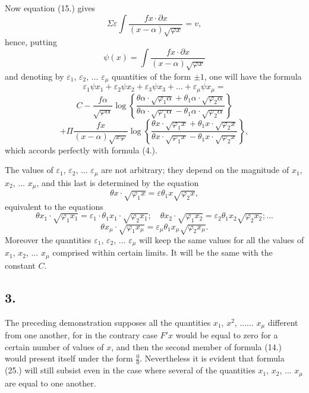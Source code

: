 \documentclass{article}
\begin{document}
Now equation (15.) gives
\[ \Sigma\varepsilon\int \frac{fx \cdot \partial x}{(x-\alpha)\sqrt{\varphi x}} = v, \]
hence, putting
\[ \psi(x) = \int \frac{fx \cdot \partial x}{(x-\alpha)\sqrt{\varphi x}} \tag{24} \]
and denoting by $\varepsilon_1$, $\varepsilon_2$, $\ldots$ $\varepsilon_\mu$ quantities of the form $\pm 1$, one will have the formula
\[ \varepsilon_1\psi x_1 + \varepsilon_2\psi x_2 + \varepsilon_3\psi x_3 + \ldots + \varepsilon_\mu\psi x_\mu = \tag{25} \]
\[ C - \frac{f\alpha}{\sqrt{\varphi\alpha}}\log\left\{\frac{\theta\alpha \cdot \sqrt{\varphi_1\alpha}+\theta_1\alpha \cdot \sqrt{\varphi_2\alpha}}{\theta\alpha \cdot \sqrt{\varphi_1\alpha}-\theta_1\alpha \cdot \sqrt{\varphi_2\alpha}}\right\} \]
\[ + \Pi\frac{fx}{(x-\alpha)\sqrt{x\varphi}}\log\left\{\frac{\theta x \cdot \sqrt{\varphi_1 x}+\theta_1 x \cdot \sqrt{\varphi_2 x}}{\theta x \cdot \sqrt{\varphi_1 x}-\theta_1 x \cdot \sqrt{\varphi_2 x}}\right\}, \]
which accords perfectly with formula (4.).

The values of $\varepsilon_1$, $\varepsilon_2$, $\ldots$ $\varepsilon_\mu$ are not arbitrary; they depend on the magnitude of $x_1$, $x_2$, $\ldots$ $x_\mu$, and this last is determined by the equation
\[ \theta x \cdot \sqrt{\varphi_1 x} = \varepsilon\theta_1 x\sqrt{\varphi_2 x}, \]
equivalent to the equations
\[ \theta x_1 \cdot \sqrt{\varphi_1 x_1} = \varepsilon_1 \cdot \theta_1 x_1 \cdot \sqrt{\varphi_2 x_1}; \quad \theta x_2 \cdot \sqrt{\varphi_1 x_2} = \varepsilon_2\theta_1 x_2\sqrt{\varphi_2 x_2}; \ldots \tag{26} \]
\[ \theta x_\mu \cdot \sqrt{\varphi_1 x_\mu} = \varepsilon_\mu\theta_1 x_\mu\sqrt{\varphi_2 x_\mu}. \]
Moreover the quantities $\varepsilon_1$, $\varepsilon_2$, $\ldots$ $\varepsilon_\mu$ will keep the same values for all the values of $x_1$, $x_2$, $\ldots$ $x_\mu$ comprised within certain limits. It will be the same with the constant $C$.

\subsection*{3.}

The preceding demonstration supposes all the quantities $x_1$, $x^{2}$, $\ldots\ldots$ $x_\mu$ different from one another, for in the contrary case $F'x$ would be equal to zero for a certain number of values of $x$, and then the second
member of formula (14.) would present itself under the form $\frac{0}{0}$. Nevertheless it is evident that formula (25.) will still subsist even in the case where several of the quantities $x_1$, $x_2$, $\ldots$ $x_\mu$ are equal to one another.
\end{document}
